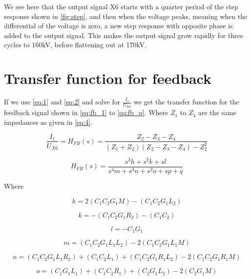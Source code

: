 We see here that the output signal X6 starts with a quarter period of the step response shown in \cref{fig:step}, and then when the voltage peaks, meaning when the differential of the voltage is zero, a new step response with opposite phase is added to the output signal. This makes the output signal grow rapidly for three cycles to 160kV, before flattening out at 170kV.

\newpage
\section{Transfer function for feedback}
\label{sec:mod_fb}
If we use \cref{eq:1} and \cref{eq:2} and solve for $\frac{I_1}{U_{X6}}$ we get the transfer function for the feedback signal shown in \cref{eq:fb_1} to \cref{eq:fb_q}. Where $Z_1$ to $Z_4$ are the same impedances as given in \cref{eq:4}.

\begin{equation} \label{eq:fb_1}
\frac{I_1}{U_{X6}} = H_{FB}(s) = \frac{Z_2-Z_3-Z_4}{(Z_1+Z_2)(Z_2-Z_3-Z_4)-Z_2^2}
\end{equation}

\begin{equation} \label{eq:fb_2}
    H_{FB}(s) = \frac{s^3 h + s^2 k + s l}{s^4 m + s^3 n + s^2 o + s p + q}
\end{equation}

Where

\begin{equation}
    h = 2(C_1 C_2 G_1 M) - (C_1 C_2 G_1 L_2)
\end{equation}

\begin{equation}
    k = -(C_1 C_2 G_1 R_2) - (C_1 C_2)
\end{equation}

\begin{equation}
    l = -C_1 G_1
\end{equation}

\begin{equation}
    m = (C_1 C_2 G_1 L_1 L_2)-2(C_1 C_2 G_1 L_1 M)
\end{equation}

\begin{equation} \label{eq:fb_n}
    n = (C_1 C_2 G_1 L_1 R_2) + (C_1 C_2 L_1) + (C_1 C_2 G_1 R_1 L_2) - 2(C_1 C_2 G_1 R_1 M)
\end{equation}

\begin{equation} \label{eq:fb_o}
    o = (C_1 G_1 L_1) + (C_1 C_2 R_1) + (C_2 G_1 L_2) -2(C_2 G_1 M)
\end{equation}

